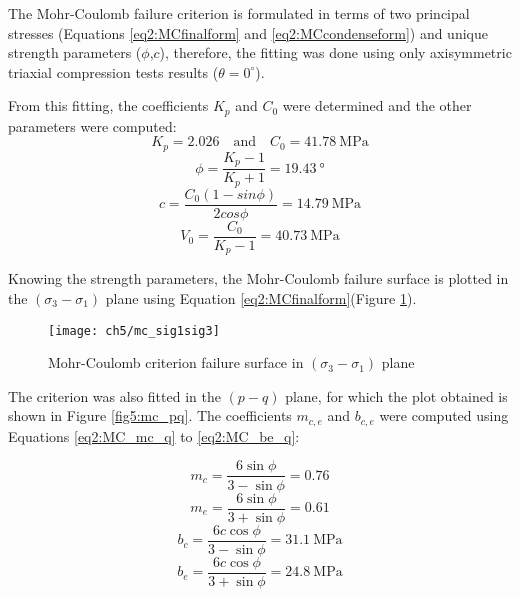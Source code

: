 The Mohr-Coulomb failure criterion is formulated in terms of two principal stresses (Equations \ref{eq2:MCfinalform} and \ref{eq2:MCcondenseform}) and unique strength parameters ($\phi$,$c$), therefore, the fitting was done using only axisymmetric triaxial compression tests results ($\theta = 0^\circ$). 

From this fitting, the coefficients $K_p$ and $C_0$ were determined and the other parameters were computed: 
\begin{equation}
    K_p = 2.026 \quad \textrm{and} \quad C_0 = \SI{41.78}{\mega\pascal}
\end{equation}
\begin{equation}
    \phi = \frac{K_p-1}{K_p+1} = \SI{19.43}{\degree}
\end{equation}
\begin{equation}
    c = \frac{C_0(1-sin\phi)}{2cos\phi} = \SI{14.79}{\mega\pascal}
\end{equation}
\begin{equation}
    V_0 = \frac{C_0}{K_p-1} = \SI{40.73}{\mega\pascal}
\end{equation}

Knowing the strength parameters, the Mohr-Coulomb failure surface is plotted in the $(\sigma_3-\sigma_1)$ plane using Equation \ref{eq2:MCfinalform}(Figure \ref{fig5:mc_sig1sig3}).

\begin{figure}[p]
    \centering
    \texttt{[image: ch5/mc\_sig1sig3]}
    \caption{Mohr-Coulomb criterion failure surface in  $(\sigma_3-\sigma_1)$ plane}
    \label{fig5:mc_sig1sig3}
\end{figure} 

The criterion was also fitted in the $(p-q)$ plane, for which the plot obtained is shown in Figure \ref{fig5:mc_pq}. The coefficients $m_{c,e}$ and $b_{c,e}$ were computed using Equations \ref{eq2:MC_mc_q} to \ref{eq2:MC_be_q}:

\begin{equation}
    m_c = \frac{6 \sin \phi}{3-\sin \phi} = 0.76
\end{equation}
\begin{equation}
    m_e = \frac{6 \sin \phi}{3+\sin \phi} = 0.61
\end{equation}
\begin{equation}
    b_c = \frac{6 c \cos \phi}{3-\sin \phi} = \SI{31.1}{\mega\pascal}
\end{equation}
\begin{equation}
    b_e = \frac{6 c \cos \phi}{3+\sin \phi} = \SI{24.8}{\mega\pascal}
\end{equation}

